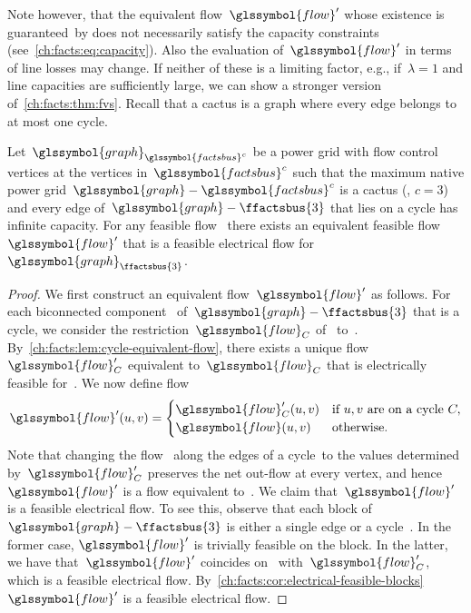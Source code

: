 %
Note however, that the equivalent flow~$\glssymbol{flow}'$ whose existence is guaranteed~by
 does not necessarily satisfy
the capacity constraints (see~\cref{ch:facts:eq:capacity}). Also the evaluation
of~$\glssymbol{flow}'$ in terms of line losses may change. If neither of these is a
limiting factor, e.g., if~$\lambda = 1$ and line capacities are sufficiently
large, we can show a stronger version of~\cref{ch:facts:thm:fvs}.  Recall that a
cactus is a graph where every edge belongs to at most one cycle.
%
\begin{theorem}
  Let~$\glssymbol{graph}_{\glssymbol{factsbus}^c}$ be a power grid with flow
  control vertices at the vertices in~$\glssymbol{factsbus}^c$ such that the
  maximum native power grid~$\glssymbol{graph}-\glssymbol{factsbus}^c$ is a
  cactus (\ie, $c = 3$) and every edge of~$\glssymbol{graph}-\ffactsbus{3}$ that
  lies on a cycle has infinite capacity. For any feasible flow~
  there exists an equivalent feasible flow~$\glssymbol{flow}'$ that is a
  feasible electrical flow for~$\glssymbol{graph}_{\ffactsbus{3}}$.
  \label{ch:facts:thm:cactus}
\end{theorem}
%
\begin{proof}
    We first construct an equivalent flow~$\glssymbol{flow}'$ as follows.  For
    each biconnected component~\connectedComponent
    of~$\glssymbol{graph}-\ffactsbus{3}$ that is a cycle, we consider the
    restriction~$\glssymbol{flow}_\connectedComponent$ of~
    to~\connectedComponent. By~\cref{ch:facts:lem:cycle-equivalent-flow}, there
    exists a unique flow~$\glssymbol{flow}_{\connectedComponent}'$ equivalent
    to~$\glssymbol{flow}_\connectedComponent$ that is electrically feasible
    for~\connectedComponent. We now define flow
    \begin{equation*}
      \glssymbol{flow}'(\vertexa,\vertexb) =
      \begin{cases}
        \glssymbol{flow}'_{\connectedComponent} ( \vertexa, \vertexb ) & \text{if }
        \vertexa,\vertexb \text{ are on a cycle } \connectedComponent,\\
        \glssymbol{flow} ( \vertexa, \vertexb) & \text{otherwise.}
      \end{cases}
    \end{equation*}
    Note that changing the flow~ along the edges of a
    cycle~\connectedComponent to the values determined
    by~$\glssymbol{flow}_{\connectedComponent}'$ preserves the net out-flow at
    every vertex, and hence~$\glssymbol{flow}'$ is a flow equivalent
    to~.  We claim that~$\glssymbol{flow}'$ is a feasible
    electrical flow. To see this, observe that each block
    of~$\glssymbol{graph}-\ffactsbus{3}$ is either a single edge or a
    cycle~\connectedComponent.  In the former case, $\glssymbol{flow}'$ is
    trivially feasible on the block. In the latter, we have
    that~$\glssymbol{flow}'$ coincides on~\connectedComponent
    with~$\glssymbol{flow}_{\connectedComponent}'$, which is a feasible
    electrical flow.
    By~\cref{ch:facts:cor:electrical-feasible-blocks}~$\glssymbol{flow}'$ is a
    feasible electrical flow.
\end{proof}
